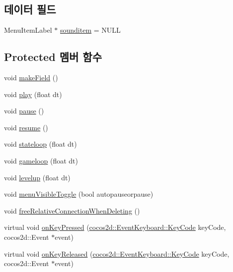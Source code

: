 \subsection*{데이터 필드}
\begin{DoxyCompactItemize}
\item 
Menu\+Item\+Label $\ast$ \hyperlink{class_hello_world_adb09915c0ac4077d51f46e2645bc4c0a}{sounditem} = N\+U\+LL
\end{DoxyCompactItemize}
\subsection*{Protected 멤버 함수}
\begin{DoxyCompactItemize}
\item 
void \hyperlink{class_hello_world_ac7cca1564e8be641f0d52b97040c0a69}{make\+Field} ()
\item 
void \hyperlink{class_hello_world_ac1aee383de0a7c30e84f7efc0da8d944}{play} (float dt)
\item 
void \hyperlink{class_hello_world_af72bece97d2fe997936df92723636298}{pause} ()
\item 
void \hyperlink{class_hello_world_ad72b45627fe36ea8cd04b9de431edc7f}{resume} ()
\item 
void \hyperlink{class_hello_world_a4ab71b15b7e362af143d2a539e39a538}{stateloop} (float dt)
\item 
void \hyperlink{class_hello_world_af59f38fb445c1302e5d2f7e18d0ab0e5}{gameloop} (float dt)
\item 
void \hyperlink{class_hello_world_af1590254503ba391a084d767df2dd858}{levelup} (float dt)
\item 
void \hyperlink{class_hello_world_a38047ef68d46872dd39be5d4cc59ad18}{menu\+Visible\+Toggle} (bool autopauseorpause)
\item 
void \hyperlink{class_hello_world_ab2e9dbd1b003e6d26a10a76495efcc2a}{free\+Relative\+Connection\+When\+Deleting} ()
\item 
virtual void \hyperlink{class_hello_world_af2d5a509259a5d0fce7770a38df371d3}{on\+Key\+Pressed} (\hyperlink{_hello_world_scene_8cpp_a29d93764040e709187aa17656a43405d}{cocos2d\+::\+Event\+Keyboard\+::\+Key\+Code} key\+Code, cocos2d\+::\+Event $\ast$event)
\item 
virtual void \hyperlink{class_hello_world_acb7b8934f4697e752182a650a1dc7c3a}{on\+Key\+Released} (\hyperlink{_hello_world_scene_8cpp_a29d93764040e709187aa17656a43405d}{cocos2d\+::\+Event\+Keyboard\+::\+Key\+Code} key\+Code, cocos2d\+::\+Event $\ast$event)
\item 

\end{DoxyCompactItemize}

